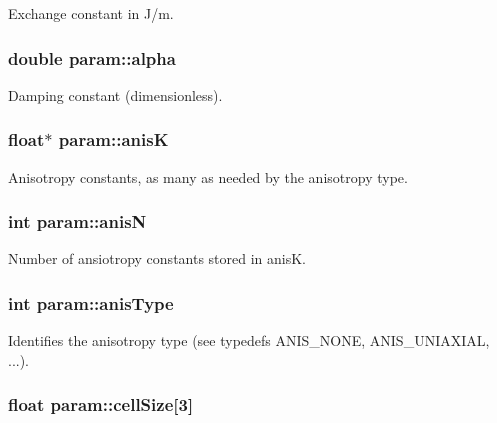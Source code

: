 Exchange constant in J/m. 

\hypertarget{structparam_af4838a61f63120c740e89f8eed3e4081}{
\subsubsection[{alpha}]{\setlength{\rightskip}{0pt plus 5cm}double {\bf param::alpha}}}
\label{structparam_af4838a61f63120c740e89f8eed3e4081}


Damping constant (dimensionless). 

\hypertarget{structparam_a048929d707ab3a3e0422c4480a6363c8}{
\subsubsection[{anisK}]{\setlength{\rightskip}{0pt plus 5cm}float$\ast$ {\bf param::anisK}}}
\label{structparam_a048929d707ab3a3e0422c4480a6363c8}


Anisotropy constants, as many as needed by the anisotropy type. 

\hypertarget{structparam_a29f829cb0bc4c83180acfa598da79955}{
\subsubsection[{anisN}]{\setlength{\rightskip}{0pt plus 5cm}int {\bf param::anisN}}}
\label{structparam_a29f829cb0bc4c83180acfa598da79955}


Number of ansiotropy constants stored in anisK. 

\hypertarget{structparam_a406d002048cd0590e61d33bc2f02744a}{
\subsubsection[{anisType}]{\setlength{\rightskip}{0pt plus 5cm}int {\bf param::anisType}}}
\label{structparam_a406d002048cd0590e61d33bc2f02744a}


Identifies the anisotropy type (see typedefs ANIS\_\-NONE, ANIS\_\-UNIAXIAL, ...). 

\hypertarget{structparam_a00c9d4254065173938a44d390b262c09}{
\subsubsection[{cellSize}]{\setlength{\rightskip}{0pt plus 5cm}float {\bf param::cellSize}\mbox{[}3\mbox{]}}}
\label{structparam_a00c9d4254065173938a44d390b262c09}


